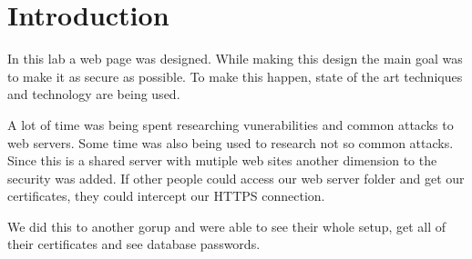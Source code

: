 \section{Introduction}

In this lab a web page was designed.
While making this design the main goal was to make it as secure as possible.
To make this happen, state of the art techniques and technology are being used.

A lot of time was being spent researching vunerabilities and common attacks to web servers.
Some time was also being used to research not so common attacks.
Since this is a shared server with mutiple web sites another dimension to the security was added.
If other people could access our web server folder and get our certificates, they could intercept our HTTPS connection.

We did this to another gorup and were able to see their whole setup, get all of their certificates and see database passwords.
